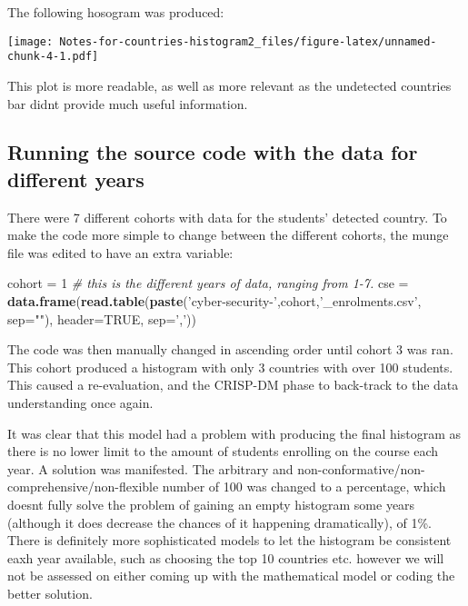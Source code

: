 \documentclass[]{article}
\newenvironment{Shaded}{\begin{snugshade}}{\end{snugshade}}
\newcommand{\KeywordTok}[1]{\textcolor[rgb]{0.13,0.29,0.53}{\textbf{#1}}}
\newcommand{\DataTypeTok}[1]{\textcolor[rgb]{0.13,0.29,0.53}{#1}}
\newcommand{\DecValTok}[1]{\textcolor[rgb]{0.00,0.00,0.81}{#1}}
\newcommand{\StringTok}[1]{\textcolor[rgb]{0.31,0.60,0.02}{#1}}
\newcommand{\CommentTok}[1]{\textcolor[rgb]{0.56,0.35,0.01}{\textit{#1}}}
\newcommand{\OtherTok}[1]{\textcolor[rgb]{0.56,0.35,0.01}{#1}}
\newcommand{\NormalTok}[1]{#1}
\begin{document}
The following hosogram was produced:

\texttt{[image: Notes-for-countries-histogram2\_files/figure-latex/unnamed-chunk-4-1.pdf]}

This plot is more readable, as well as more relevant as the undetected
countries bar didnt provide much useful information.

\subsection{Running the source code with the data for different
years}\label{running-the-source-code-with-the-data-for-different-years}

There were 7 different cohorts with data for the students' detected
country. To make the code more simple to change between the different
cohorts, the munge file was edited to have an extra variable:

\begin{Shaded}
\begin{Highlighting}[]
\NormalTok{cohort =}\StringTok{ }\DecValTok{1}    \CommentTok{# this is the different years of data, ranging from 1-7.}
\NormalTok{cse =}\StringTok{ }\KeywordTok{data.frame}\NormalTok{(}\KeywordTok{read.table}\NormalTok{(}\KeywordTok{paste}\NormalTok{(}\StringTok{'cyber-security-'}\NormalTok{,cohort,}\StringTok{'_enrolments.csv'}\NormalTok{, }\DataTypeTok{sep=}\StringTok{""}\NormalTok{), }\DataTypeTok{header=}\OtherTok{TRUE}\NormalTok{, }\DataTypeTok{sep=}\StringTok{','}\NormalTok{))}
\end{Highlighting}
\end{Shaded}

The code was then manually changed in ascending order until cohort 3 was
ran. This cohort produced a histogram with only 3 countries with over
100 students. This caused a re-evaluation, and the CRISP-DM phase to
back-track to the data understanding once again.

It was clear that this model had a problem with producing the final
histogram as there is no lower limit to the amount of students enrolling
on the course each year. A solution was manifested. The arbitrary and
non-conformative/non-comprehensive/non-flexible number of 100 was
changed to a percentage, which doesnt fully solve the problem of gaining
an empty histogram some years (although it does decrease the chances of
it happening dramatically), of 1\%. There is definitely more
sophisticated models to let the histogram be consistent eaxh year
available, such as choosing the top 10 countries etc. however we will
not be assessed on either coming up with the mathematical model or
coding the better solution.
\end{document}
